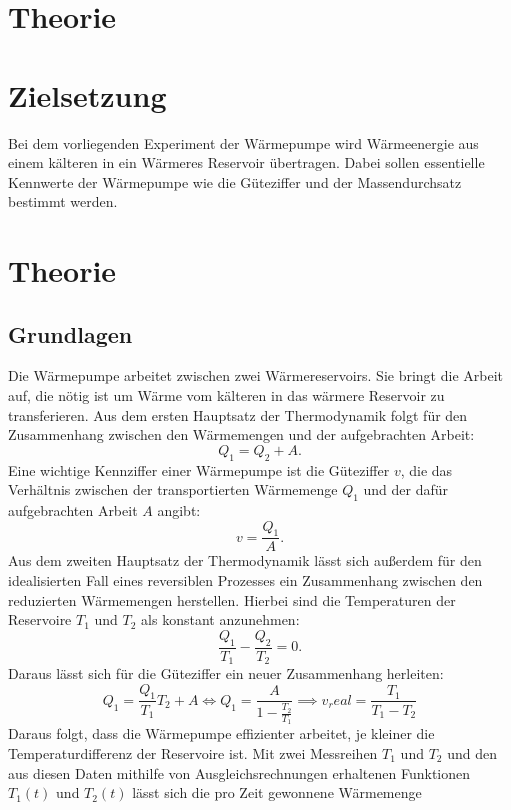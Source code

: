 \section{Theorie}
\label{sec:Theorie}
\section{Zielsetzung}
Bei dem vorliegenden Experiment der Wärmepumpe wird Wärmeenergie aus einem kälteren in ein Wärmeres Reservoir übertragen. Dabei sollen essentielle Kennwerte der Wärmepumpe wie die Güteziffer und der Massendurchsatz bestimmt werden.
\section{Theorie}
\subsection{Grundlagen}
Die Wärmepumpe arbeitet zwischen zwei Wärmereservoirs. Sie bringt die Arbeit auf, die nötig ist um Wärme vom kälteren in das wärmere Reservoir zu transferieren. Aus dem ersten Hauptsatz der Thermodynamik folgt für den Zusammenhang zwischen den Wärmemengen und der aufgebrachten Arbeit:
\begin{equation*}
Q_1=Q_2+A.
\end{equation*}
Eine wichtige Kennziffer einer Wärmepumpe ist die Güteziffer $v$, die das Verhältnis zwischen der transportierten Wärmemenge $Q_1$ und der dafür aufgebrachten Arbeit $A$ angibt:
\begin{equation*}
v=\frac{Q_1}{A}.
\end{equation*}
Aus dem zweiten Hauptsatz der Thermodynamik lässt sich außerdem für den idealisierten Fall eines reversiblen Prozesses ein Zusammenhang zwischen den reduzierten Wärmemengen herstellen. Hierbei sind die Temperaturen der Reservoire $T_1$ und $T_2$ als konstant anzunehmen:
\begin{equation*}
\frac{Q_1}{T_1}-\frac{Q_2}{T_2}=0.
\end{equation*}
Daraus lässt sich für die Güteziffer ein neuer Zusammenhang herleiten:
\begin{equation}
Q_1=\frac{Q_1}{T_1}T_2+A \iff Q_1=\frac{A}{1-\frac{T_2}{T_1}}
\implies v_real=\frac{T_1}{T_1-T_2}
\end{equation}
Daraus folgt, dass die Wärmepumpe effizienter arbeitet, je kleiner die Temperaturdifferenz der Reservoire ist.
Mit zwei Messreihen $T_1$ und $T_2$ und den aus diesen Daten mithilfe von Ausgleichsrechnungen erhaltenen Funktionen $T_1(t)$ und $T_2(t)$ lässt sich die pro Zeit gewonnene Wärmemenge 
